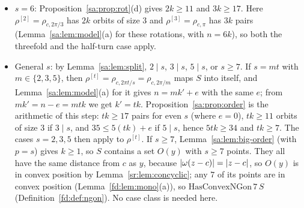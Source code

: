 \begin{remark}
\begin{itemize}
  complex notation, $c+e^{i\alpha}\bigl(c+e^{i\beta}(z-c)-c\bigr)=c+e^{i(\alpha+\beta)}(z-c)$), so
  $\rho^{[2]}=\rho_{c,\pi}$ is the
  half-turn; Lemma~\ref{sa:lem:model}(a) for it gives $n=2k'$, and $k'=2k\ge17$, so the case $s=2$ applies. (Eight of
  the $k$ orbits would give the $32$ points of the class . Among the reduction theorems and case
  lemmas stated in this document, only Theorem~\ref{sr:thm:variant} and the case lemma
   that its proof uses take this class as a hypothesis (so do some checks of that
  theorem in the review file , among them its group form
  ); a same-text copy, , is the hypothesis of
  Theorem~\ref{ec:thm:fourfold} and of its layer form , which its proof
  uses;
  item~(5) uses the class for the size table.)
\item $s=6$: Proposition~\ref{sa:prop:rot}(d) gives $2k\ge11$ and $3k\ge17$. Here $\rho^{[2]}=\rho_{c,2\pi/3}$ has
  $2k$ orbits of size $3$ and $\rho^{[3]}=\rho_{c,\pi}$ has $3k$ pairs (Lemma~\ref{sa:lem:model}(a) for these
  rotations, with $n=6k$), so both the threefold and the half-turn case apply.
\item General $s$: by Lemma~\ref{sa:lem:split}, $2\mid s$, $3\mid s$, $5\mid s$, or $s\ge7$. If $s=mt$ with
  $m\in\{2,3,5\}$, then $\rho^{[t]}=\rho_{c,2\pi t/s}=\rho_{c,2\pi/m}$ maps $S$ into itself, and
  Lemma~\ref{sa:lem:model}(a) for it gives $n=mk'+e$ with the same $e$; from $mk'=n-e=mtk$ we get $k'=tk$.
  Proposition~\ref{sa:prop:order} is the arithmetic of this step: $tk\ge17$ pairs for even $s$ (where $e=0$),
  $tk\ge11$ orbits of size $3$ if $3\mid s$, and $35\le5(tk)+e$ if $5\mid s$, hence $5tk\ge34$ and $tk\ge7$. The cases
  $s=2,3,5$ then apply to $\rho^{[t]}$. If $s\ge7$, Lemma~\ref{sa:lem:big-order} (with $p=s$) gives $k\ge1$, so $S$
  contains a set $O(y)$ with $s\ge7$ points. They all have the same distance from $c$ as $y$, because
  $\lvert\omega(z-c)\rvert=\lvert z-c\rvert$, so $O(y)$ is in convex position by Lemma~\ref{sr:lem:concyclic}; any $7$ of its
  points are in convex position (Lemma~\ref{fd:lem:mono}(a)), so $\mathrm{HasConvexNGon}\,7\,S$
  (Definition~\ref{fd:def:ngon}). No case class is needed here.
\end{itemize}


\end{remark}
